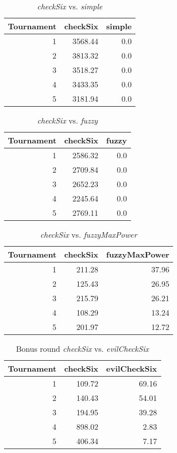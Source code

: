 \begin{table}[H]
\centering
\caption{\emph{checkSix} vs. \emph{simple}}
\label{checkSix vs. simple}
\begin{tabular}{r|r|r}
Tournament	& checkSix	& simple	\\ \hline
1			& 3568.44	& 0.0		\\
2			& 3813.32	& 0.0		\\
3			& 3518.27	& 0.0		\\
4			& 3433.35	& 0.0		\\
5			& 3181.94	& 0.0
\end{tabular}
\end{table}

\begin{table}[H]
\centering
\caption{\emph{checkSix} vs. \emph{fuzzy}}
\label{checkSix vs. fuzzy}
\begin{tabular}{r|r|r}
Tournament	& checkSix	& fuzzy	\\ \hline
1			& 2586.32	& 0.0	\\
2			& 2709.84	& 0.0	\\
3			& 2652.23	& 0.0	\\
4			& 2245.64	& 0.0	\\
5			& 2769.11	& 0.0
\end{tabular}
\end{table}

\begin{table}[H]
\centering
\caption{\emph{checkSix} vs. \emph{fuzzyMaxPower}}
\label{checkSix vs. fuzzyMaxPower}
\begin{tabular}{r|r|r}
Tournament	& checkSix	& fuzzyMaxPower	\\ \hline
1			& 211.28	& 37.96			\\
2			& 125.43	& 26.95			\\
3			& 215.79	& 26.21			\\
4			& 108.29	& 13.24			\\
5			& 201.97	& 12.72
\end{tabular}
\end{table}

\begin{table}[H]
\centering
\caption{Bonus round \emph{checkSix} vs. \emph{evilCheckSix}}
\label{Bonus round checkSix vs. evilCheckSix}
\begin{tabular}{r|r|r}
Tournament	& checkSix	& evilCheckSix	\\ \hline
1			& 109.72	& 69.16			\\
2			& 140.43	& 54.01			\\
3			& 194.95	& 39.28			\\
4			& 898.02	& 2.83			\\
5			& 406.34	& 7.17
\end{tabular}
\end{table}